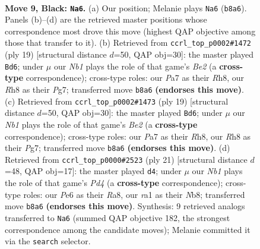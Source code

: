 \documentclass[11pt]{article}
\begin{document}
\clearpage

\begin{figure}[p]\centering
\begin{subfigure}{0.46\textwidth}\centering
\resizebox{\linewidth}{!}{%
\newchessgame
\chessboard[
  setfen={rn1qkb1r/pp3p1p/4pnp1/3p4/P2P2P1/2N2Q1P/1PP2P2/R1B1KB1R b KQkq - 0 9},
  showmover=false,
  pgfstyle=straightmove, color=movearrow, markmove={b8-a6}
]}
\caption{}
\end{subfigure}\hfill
\begin{subfigure}{0.46\textwidth}\centering
\resizebox{\linewidth}{!}{%
\newchessgame
\chessboard[
  setfen={rn1qk2r/pp2bppp/2p2n2/3p4/3P1B2/2N1P3/PPQ2PPP/R3KB1R b KQkq - 0 10},
  showmover=false,
  pgfstyle=straightmove, color=movearrow, markmove={e7-d6}
]}
\caption{}
\end{subfigure}
\\[4pt]
\begin{subfigure}{0.46\textwidth}\centering
\resizebox{\linewidth}{!}{%
\newchessgame
\chessboard[
  setfen={rn1qk2r/pp2bppp/2p2n2/3p4/3P1B2/2N1P3/PPQ2PPP/R3KB1R b KQkq - 0 10},
  showmover=false,
  pgfstyle=straightmove, color=movearrow, markmove={e7-d6}
]}
\caption{}
\end{subfigure}\hfill
\begin{subfigure}{0.46\textwidth}\centering
\resizebox{\linewidth}{!}{%
\newchessgame
\chessboard[
  setfen={rnbqkb1r/1p3p1p/p4n2/3ppPP1/8/2N1BQ2/PPP2P1P/R3KB1R b KQkq - 1 11},
  showmover=false,
  pgfstyle=straightmove, color=movearrow, markmove={d5-d4}
]}
\caption{}
\end{subfigure}
\caption{\textbf{Move 9, Black: \texttt{Na6}.} (a) Our position; Melanie plays \texttt{Na6} (\texttt{b8a6}). Panels (b)--(d) are the retrieved master positions whose correspondence most drove this move (highest QAP objective among those that transfer to it). (b) Retrieved from \texttt{ccrl\_top\_p0002\#1472} (ply 19) [structural distance $d$=50, QAP obj=30]: the master played \texttt{Bd6}; under $\mu$ our \emph{Nb1} plays the role of that game's \emph{Be2} (a \textbf{cross-type} correspondence); cross-type roles: our \emph{P}a7 as their \emph{R}h8, our \emph{R}h8 as their \emph{P}g7; transferred move \texttt{b8a6} \textbf{(endorses this move)}. (c) Retrieved from \texttt{ccrl\_top\_p0002\#1473} (ply 19) [structural distance $d$=50, QAP obj=30]: the master played \texttt{Bd6}; under $\mu$ our \emph{Nb1} plays the role of that game's \emph{Be2} (a \textbf{cross-type} correspondence); cross-type roles: our \emph{P}a7 as their \emph{R}h8, our \emph{R}h8 as their \emph{P}g7; transferred move \texttt{b8a6} \textbf{(endorses this move)}. (d) Retrieved from \texttt{ccrl\_top\_p0000\#2523} (ply 21) [structural distance $d$=48, QAP obj=17]: the master played \texttt{d4}; under $\mu$ our \emph{Nb1} plays the role of that game's \emph{Pd4} (a \textbf{cross-type} correspondence); cross-type roles: our \emph{P}e6 as their \emph{R}a8, our \emph{r}a1 as their \emph{N}b8; transferred move \texttt{b8a6} \textbf{(endorses this move)}. Synthesis: 9 retrieved analogs transferred to \texttt{Na6} (summed QAP objective 182, the strongest correspondence among the candidate moves); Melanie committed it via the \texttt{search} selector.}

\end{figure}
\end{document}
